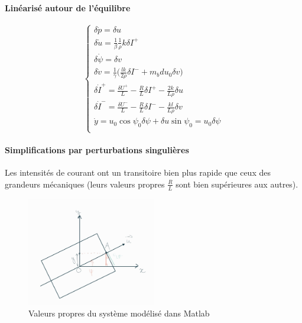 \documentclass{report}
\begin{document}
\paragraph{Linéarisé autour de l'équilibre}

\begin{equation*}
    \begin{cases}
        \delta{\dot p} = \delta u \\
        \delta{\dot u} = \frac{1}{\beta}\frac{1}{\rho}k\delta I^{+} \\
        \delta{\dot \psi} = \delta v \\
        \delta{\dot v} = \frac{1}{\gamma}\big( \frac{lk}{2\rho}\delta I^{-} + m_bd u_0 \delta v \big) \\
        \delta{\dot I^{+}} = \frac{\delta U^{+}}{L} - \frac{R}{L}\delta I^{+} - \frac{2k}{L\rho}\delta u \\
        \delta{\dot I^{-}} = \frac{\delta U^{-}}{L} - \frac{R}{L}\delta I^{-} - \frac{kl}{L\rho}\delta v \\
        \dot{y} = u_0\cos\psi_0 \delta \psi + \delta u \sin\psi_0 = u_0 \delta \psi \\
    \end{cases}
\end{equation*}

\paragraph{Simplifications par perturbations singulières}

Les intensités de courant ont un transitoire bien plus rapide que
ceux des grandeurs mécaniques (leurs valeurs propres $\frac{R}{L}$ sont bien supérieures aux autres).

\begin{figure}[h]  %
    \centering
    \includegraphics[width=0.5\textwidth]{figures/cLF_schema.jpg}
    \caption{Valeurs propres du système modélisé dans Matlab}
\end{figure}
\end{document}

